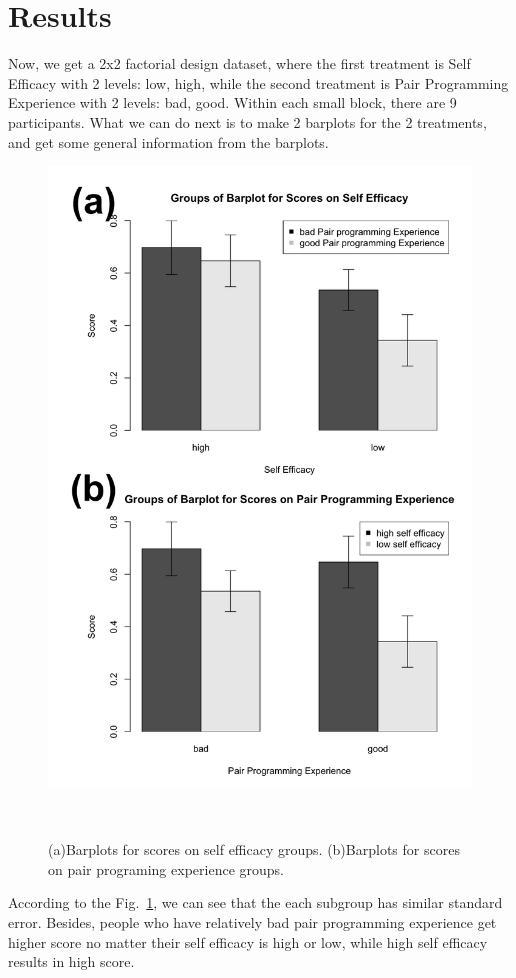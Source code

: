 \documentclass{sigchi}
\begin{document}
\section{Results}

Now, we get a 2x2 factorial design dataset, where the first treatment is Self Efficacy with 2 levels: low, high, while the second treatment is Pair Programming Experience with 2 levels: bad, good. Within each small block, there are 9 participants. What we can do next is to make 2 barplots for the 2 treatments, and get some general information from the barplots.

\begin{figure}
\centering
  \includegraphics[width=0.8\columnwidth]{figures/fig3}
  \caption{(a)Barplots for scores on self efficacy groups. (b)Barplots for scores on pair programing experience groups.}~\label{fig:figure3}
\end{figure}

According to the Fig.~\ref{fig:figure3}, we can see that the each subgroup has similar standard error. Besides, people who have relatively bad pair programming experience get higher score no matter their self efficacy is high or low, while high self efficacy results in high score. 
\end{document}
